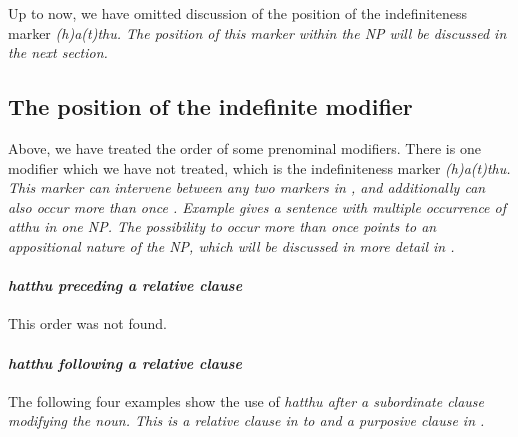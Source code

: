Up to now, we have omitted discussion of the position of the indefiniteness marker \em (h)a(t)thu\em. The position of this marker within the NP will be discussed in the next section.

\subsection{The position of the indefinite modifier}\label{sec:nppp:Thepositionoftheindefinitemodifier}
Above, we have treated the order of some prenominal modifiers. There is one modifier which we have not treated, which is the indefiniteness marker \em (h)a(t)thu\em. This marker can intervene between any two markers in , and additionally can also occur more than once \citep[cf.][]{Slomanson2006cll}. Example  gives a sentence with multiple occurrence of \em atthu \em in one NP. The possibility to occur more than once points to an appositional nature of the NP, which will be discussed in more detail in .




\paragraph{\em hatthu \em preceding a relative clause}
This order was not found.


\paragraph{\em hatthu \em following a relative clause}

The following four examples show the use of \em hatthu \em after a subordinate clause modifying the noun. This is a relative clause in  to  and a purposive clause in .



